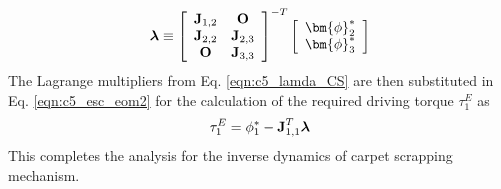{\begin{equation}
	\label{eqn:c5_lamda_CS}
	\mbox{\boldmath$\lambda$} \equiv
	\left[ \begin{array}{cc}
	\textbf{J$_{1,2}$} & \textbf{O} \\
	\textbf{J$_{2,2}$} & \textbf{J$_{2,3}$} \\
	\textbf{O} & \textbf{J$_{3,3}$}
	\end{array} \right]^{-T}\left[ \begin{array}{c}
	\bm{\phi}_2^*\\
	\bm{\phi}_3^*\\
	\end{array} \right]
	\end{equation}
	The Lagrange multipliers from Eq. \ref{eqn:c5_lamda_CS} are then substituted in Eq. \ref{eqn:c5_esc_eom2} for the calculation of the required driving torque $\tau_1^E$ as
\begin{equation}
\tau_1^E = \phi_1^* - 
\textbf{J}^T_{1,1}\mbox{\boldmath$\lambda$} 
\end{equation}
This completes the analysis for the inverse dynamics of carpet scrapping mechanism.

}
